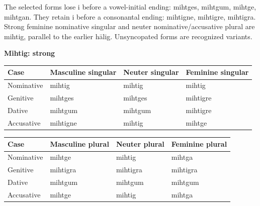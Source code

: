 The selected forms lose i before a vowel-initial ending: mihtges, mihtgum, mihtge, mihtgan. They retain i before a consonantal ending: mihtigne, mihtigre, mihtigra. Strong feminine nominative singular and neuter nominative/\allowbreak{}accusative plural are mihtig, parallel to the earlier hālig. Unsyncopated forms are recognized variants.

\textbf{Mihtig: strong}

\par\begingroup
\fontsize{10.5}{13.2}\selectfont
\setlength{\LTleft}{0pt}\setlength{\LTright}{\fill}
\noindent
\begin{tabular}{@{}>{\raggedright\arraybackslash}p{22.0mm}>{\raggedright\arraybackslash}p{31.188mm}>{\raggedright\arraybackslash}p{31.188mm}>{\raggedright\arraybackslash}p{31.188mm}@{}}
\toprule
\textbf{Case} & \textbf{Masculine singular} & \textbf{Neuter singular} & \textbf{Feminine singular} \\
\midrule
Nominative & mihtig & mihtig & mihtig \\
Genitive & mihtges & mihtges & mihtigre \\
Dative & mihtgum & mihtgum & mihtigre \\
Accusative & mihtigne & mihtig & mihtge \\
\bottomrule
\end{tabular}
\par\endgroup
\par\addvspace{5pt}
\par\begingroup
\fontsize{10.5}{13.2}\selectfont
\setlength{\LTleft}{0pt}\setlength{\LTright}{\fill}
\noindent
\begin{tabular}{@{}>{\raggedright\arraybackslash}p{22.0mm}>{\raggedright\arraybackslash}p{31.188mm}>{\raggedright\arraybackslash}p{31.188mm}>{\raggedright\arraybackslash}p{31.188mm}@{}}
\toprule
\textbf{Case} & \textbf{Masculine plural} & \textbf{Neuter plural} & \textbf{Feminine plural} \\
\midrule
Nominative & mihtge & mihtig & mihtga \\
Genitive & mihtigra & mihtigra & mihtigra \\
Dative & mihtgum & mihtgum & mihtgum \\
Accusative & mihtge & mihtig & mihtga \\
\bottomrule
\end{tabular}
\par\endgroup

